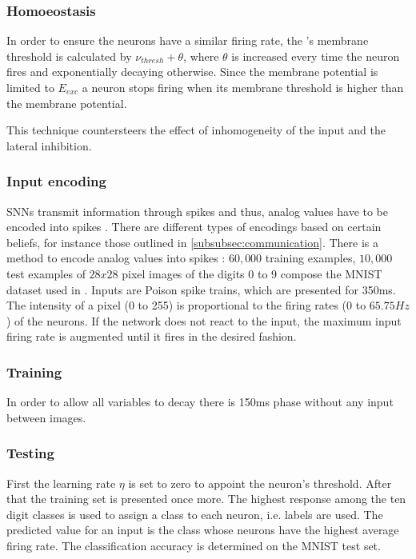 \subsubsection{Homoeostasis}
In order to ensure the neurons have a similar firing rate, the \eN{}'s membrane threshold is calculated by $\nu_{thresh} + \theta$, 
where $\theta$ is increased every time the neuron fires and exponentially decaying otherwise.
Since the membrane potential is limited to $E_{exc}$ a neuron stops firing when its membrane threshold is higher than the membrane potential.

This technique countersteers the effect of inhomogeneity of the input and the lateral inhibition.


\subsubsection{Input encoding}
\acp{SNN} transmit information through spikes and thus, analog values have to be encoded into spikes \cite{DIET_SNN}.
There are different types of encodings based on certain beliefs, 
for instance those outlined in \autoref{subsubsec:communication}.
There is a method to encode analog values into spikes \cite{SNN}:
$60,000$ training examples, $10,000$ test examples of $28x28$ pixel images of the digits 0 to 9 compose the MNIST dataset used in \cite{SNN}.
Inputs are Poison spike trains, which are presented for 350ms.
The intensity of a pixel (0 to 255) is proportional to the firing rates (0 to $65.75 Hz$) of the neurons.
If the network does not react to the input, the maximum input firing rate is augmented until it fires in the desired fashion. 


\subsubsection{Training}
In order to allow all variables to decay there is 150ms phase without any input between images.

\subsubsection{Testing}
First the learning rate $\eta$ is set to zero to appoint the neuron's threshold.
After that the training set is presented once more.
The highest response among the ten digit classes is used to assign a class to each neuron, i.e. labels are used.
The predicted value for an input is the class whose neurons have the highest average firing rate.
The classification accuracy is determined on the MNIST test set.